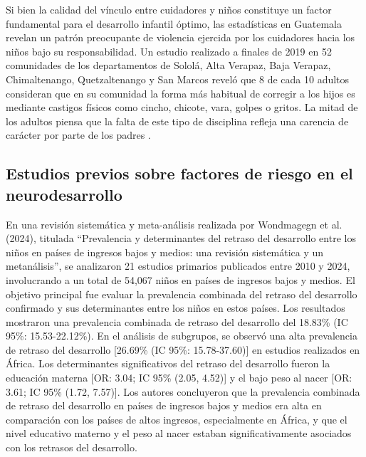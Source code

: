 \documentclass[11pt,letterpaper]{report}
\begin{document}
Si bien la calidad del vínculo entre cuidadores y niños constituye un factor
fundamental para el desarrollo infantil óptimo, las estadísticas en Guatemala
revelan un patrón preocupante de violencia ejercida por los cuidadores hacia
los niños bajo su responsabilidad. Un estudio realizado a finales de 2019 en 52
comunidades de los departamentos de Sololá, Alta Verapaz, Baja Verapaz,
Chimaltenango, Quetzaltenango y San Marcos reveló que 8 de cada 10 adultos
consideran que en su comunidad la forma más habitual de corregir a los hijos es
mediante castigos físicos como cincho, chicote, vara, golpes o gritos. La mitad
de los adultos piensa que la falta de este tipo de disciplina refleja una
carencia de carácter por parte de los padres
\cite{PoliticaInfanciaGuate, UNICEFComportamientosNinez}.

\subsection{Estudios previos sobre factores de riesgo en el neurodesarrollo}
En una revisión sistemática y meta-análisis realizada por Wondmagegn et al.
(2024), titulada ``Prevalencia y determinantes del retraso del desarrollo entre
los niños en países de ingresos bajos y medios: una revisión sistemática y un
metanálisis'', se analizaron 21 estudios primarios publicados entre 2010 y
2024, involucrando a un total de 54,067 niños en países de ingresos bajos y
medios. El objetivo principal fue evaluar la prevalencia combinada del retraso
del desarrollo confirmado y sus determinantes entre los niños en estos países.
Los resultados mostraron una prevalencia combinada de retraso del desarrollo
del 18.83\% (IC 95\%: 15.53-22.12\%). En el análisis de subgrupos, se observó
una alta prevalencia de retraso del desarrollo [26.69\% (IC 95\%: 15.78-37.60)]
en estudios realizados en África. Los determinantes significativos del retraso
del desarrollo fueron la educación materna [OR: 3.04; IC 95\% (2.05, 4.52)] y
el bajo peso al nacer [OR: 3.61; IC 95\% (1.72, 7.57)]. Los autores concluyeron
que la prevalencia combinada de retraso del desarrollo en países de ingresos
bajos y medios era alta en comparación con los países de altos ingresos,
especialmente en África, y que el nivel educativo materno y el peso al nacer
estaban significativamente asociados con los retrasos del desarrollo.
\cite{Wondmagegn2024}
\end{document}
